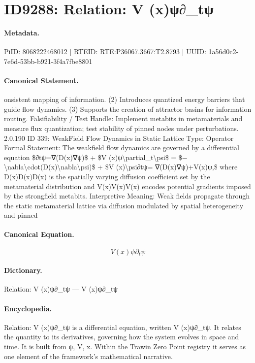 \section*{ID9288: Relation: V (x)ψ∂\_tψ}
\paragraph{Metadata.}
PiID: 8068222468012 | RTEID: RTE:P36067.3667:T2.8793 | UUID: 1a56d0c2-7e6d-53bb-b921-3f4a7fbe8801

\paragraph{Canonical Statement.}
onsistent mapping of information. (2) Introduces quantized energy barriers that guide flow dynamics. (3) Supports the creation of attractor basins for information routing. Falsifiability / Test Handle: Implement metabits in metamaterials and measure flux quantization; test stability of pinned nodes under perturbations. 2.0.190 ID 339: WeakField Flow Dynamics in Static Lattice Type: Operator Formal Statement: The weakfield flow dynamics are governed by a differential equation \$∂tψ=∇(D(x)∇ψ)\$ + \$V (x)ψ\textbackslash{}partial\_t\textbackslash{}psi\$ = \$−\textbackslash{}nabla\textbackslash{}cdot(D(x)\textbackslash{}nabla\textbackslash{}psi)\$ + \$V (x)\textbackslash{}psi∂tψ= ∇(D(x)∇ψ)+V(x)ψ,\$ where D(x)D(x)D(x) is the spatially varying diffusion coefficient set by the metamaterial distribution and V(x)V(x)V(x) encodes potential gradients imposed by the strongfield metabits. Interpretive Meaning: Weak fields propagate through the static metamaterial lattice via diffusion modulated by spatial heterogeneity and pinned

\paragraph{Canonical Equation.}
\[
V (x)ψ\partial_t\psi
\]

\paragraph{Dictionary.}
Relation: V (x)ψ∂\_tψ — V (x)ψ∂\_tψ

\paragraph{Encyclopedia.}
Relation: V (x)ψ∂\_tψ is a differential equation, written V (x)ψ∂\_tψ. It relates the quantity to its derivatives, governing how the system evolves in space and time. It is built from ψ, V, x. Within the Trawin Zero Point registry it serves as one element of the framework's mathematical narrative.
